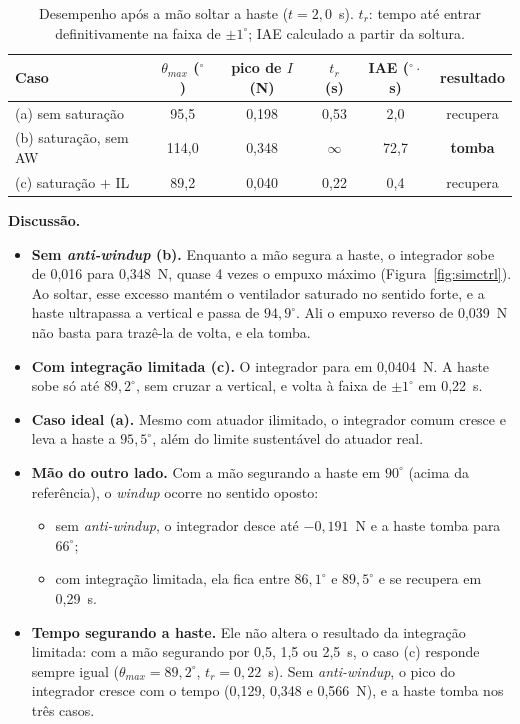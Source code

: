 \documentclass[a4paper,11pt]{article}
\begin{document}
\begin{table}[H]
\centering\small
\caption{Desempenho após a mão soltar a haste ($t=2{,}0$~s). $t_r$: tempo até entrar
definitivamente na faixa de $\pm1^\circ$; IAE calculado a partir da soltura.}
\label{tab:sim}
\begin{tabular}{@{}lccccc@{}}
\toprule
\textbf{Caso} & $\theta_{max}$ ($^\circ$) & pico de $I$ (N) & $t_r$ (s) & IAE ($^\circ\cdot$s) & resultado \\
\midrule
(a) sem saturação & 95,5 & 0,198 & 0,53 & 2,0 & recupera \\
(b) saturação, sem AW & 114,0 & 0,348 & $\infty$ & 72,7 & \textbf{tomba} \\
(c) saturação + IL & 89,2 & 0,040 & 0,22 & 0,4 & recupera \\
\bottomrule
\end{tabular}
\end{table}

\textbf{Discussão.}
\begin{itemize}
  \item \textbf{Sem \textit{anti-windup} (b).} Enquanto a mão segura a haste, o integrador sobe de
    0,016 para 0,348~N, quase 4 vezes o empuxo máximo (Figura~\ref{fig:simctrl}). Ao soltar, esse
    excesso mantém o ventilador saturado no sentido forte, e a haste ultrapassa a vertical e passa de
    $94{,}9^\circ$. Ali o empuxo reverso de 0,039~N não basta para trazê-la de volta, e ela tomba.
  \item \textbf{Com integração limitada (c).} O integrador para em 0,0404~N. A haste sobe só até
    $89{,}2^\circ$, sem cruzar a vertical, e volta à faixa de $\pm1^\circ$ em 0,22~s.
  \item \textbf{Caso ideal (a).} Mesmo com atuador ilimitado, o integrador comum cresce e leva a haste
    a $95{,}5^\circ$, além do limite sustentável do atuador real.
  \item \textbf{Mão do outro lado.} Com a mão segurando a haste em $90^\circ$ (acima da referência), o
    \textit{windup} ocorre no sentido oposto:
    \begin{itemize}
      \item sem \textit{anti-windup}, o integrador desce até $-0{,}191$~N e a haste tomba para
        $66^\circ$;
      \item com integração limitada, ela fica entre $86{,}1^\circ$ e $89{,}5^\circ$ e se recupera em
        0,29~s.
    \end{itemize}
  \item \textbf{Tempo segurando a haste.} Ele não altera o resultado da integração limitada: com a mão
    segurando por 0,5, 1,5 ou 2,5~s, o caso (c) responde sempre igual ($\theta_{max}=89{,}2^\circ$,
    $t_r=0{,}22$~s). Sem \textit{anti-windup}, o pico do integrador cresce com o tempo (0,129, 0,348 e
    0,566~N), e a haste tomba nos três casos.
\end{itemize}
\end{document}
